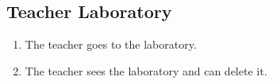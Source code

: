 \subsection{Teacher Laboratory}

\begin{enumerate}
    \item The teacher goes to the laboratory.
    \item The teacher sees the laboratory and can delete it.
\end{enumerate}
